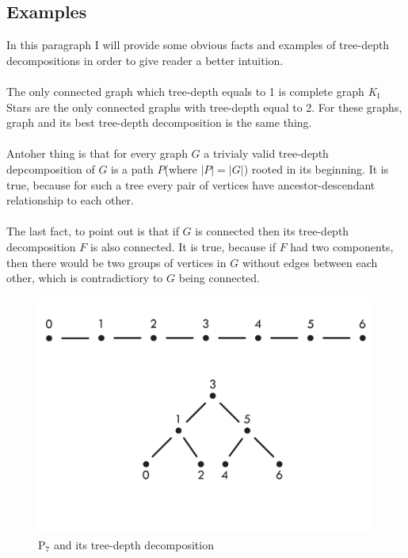 \subsection{Examples}
In this paragraph I will provide some obvious facts and examples of tree-depth decompositions in order to give reader a better intuition.\\\\
The only connected graph which tree-depth equals to 1 is complete graph \emph{K$_{1}$}\\
Stars are the only connected graphs with tree-depth equal to 2.  For these graphs, graph and its best tree-depth decomposition is the same thing.\\\\
Antoher thing is that for every graph $G$ a trivialy valid tree-depth depcomposition of $G$ is a path $P$(where $|P|=|G|$) rooted in its beginning. It is true, because for such a tree every pair of vertices have ancestor-descendant relationship to each other.\\\\
The last fact, to point out is that if $G$ is connected then its tree-depth decomposition $F$ is also connected. It is true, because if $F$ had two components, then there would be two groups of vertices in $G$ without edges between each other, which is contradictiory to $G$ being connected.
\begin{figure}[hbt!]
	\centering
	\includegraphics[scale=0.5,valign=t]{sciezka.pdf}
	\caption{P$_{7}$ and its tree-depth decomposition}
\end{figure}
\\\\\\\\

